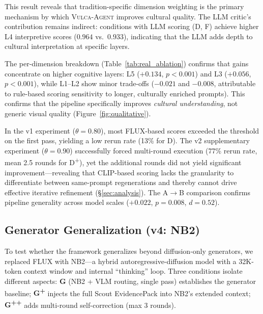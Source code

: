 \documentclass[sigconf, screen, review, anonymous]{acmart}
\newcommand{\system}{\textsc{Vulca-Agent}}
\newcommand{\Lx}[1]{L#1}
\begin{document}
This result reveals that tradition-specific dimension weighting is the primary mechanism by which \system{} improves cultural quality.
The LLM critic's contribution remains indirect: conditions with LLM scoring (D, F) achieve higher \Lx{4} interpretive scores ($0.964$ vs.\ $0.933$), indicating that the LLM adds depth to cultural interpretation at specific layers.

The per-dimension breakdown (Table~\ref{tab:real_ablation}) confirms that gains concentrate on higher cognitive layers: \Lx{5} ($+0.134$, $p < 0.001$) and \Lx{3} ($+0.056$, $p < 0.001$), while \Lx{1}--\Lx{2} show minor trade-offs ($-0.021$ and $-0.008$, attributable to rule-based scoring sensitivity to longer, culturally enriched prompts).
This confirms that the pipeline specifically improves \emph{cultural understanding}, not generic visual quality (Figure~\ref{fig:qualitative}).

In the v1 experiment ($\theta = 0.80$), most FLUX-based scores exceeded the threshold on the first pass, yielding a low rerun rate (13\% for D).
The v2 supplementary experiment ($\theta = 0.90$) successfully forced multi-round execution (77\% rerun rate, mean 2.5 rounds for D\textsuperscript{+}), yet the additional rounds did not yield significant improvement---revealing that CLIP-based scoring lacks the granularity to differentiate between same-prompt regenerations and thereby cannot drive effective iterative refinement (\S\ref{sec:analysis}).
The A$\to$B comparison confirms pipeline generality across model scales ($+0.022$, $p = 0.008$, $d = 0.52$).

\subsection{Generator Generalization (v4: NB2)}
\label{sec:v4_results}

To test whether the framework generalizes beyond diffusion-only generators, we replaced FLUX with NB2---a hybrid autoregressive-diffusion model with a 32K-token context window and internal ``thinking'' loop.
Three conditions isolate different aspects:
\textbf{G} (NB2 + VLM routing, single pass) establishes the generator baseline;
\textbf{G\textsuperscript{+}} injects the full Scout EvidencePack into NB2's extended context;
\textbf{G\textsuperscript{++}} adds multi-round self-correction (max 3 rounds).
\end{document}
